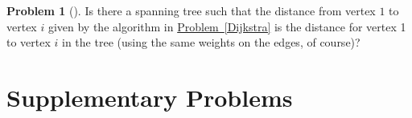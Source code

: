 \documentclass[10pt,]{book}
\theoremstyle{plain}
\theoremstyle{definition}
\newtheorem{activity}[project]{Problem}
\theoremstyle{definition}
\numberwithin{equation}{chapter}
\begin{document}
\begin{activity}[]\marginsymbol[-1em]{} \label{activity-121}
\hypertarget{p-688}{}%
Is there a spanning tree such that the distance from vertex \(1\) to vertex \(i\) given by the algorithm in \hyperref[Dijkstra]{Problem~\ref{Dijkstra}} is the distance for vertex 1 to vertex \(i\) in the tree (using the same weights on the edges, of course)?%
\end{activity}
\typeout{************************************************}
\typeout{************************************************}
\section[{Supplementary Problems}]{Supplementary Problems}\label{sec_induction-suppprobs}
\end{document}

